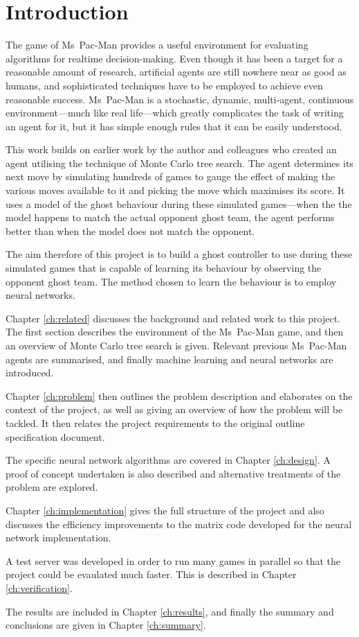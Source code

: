 \chapter{Introduction}
\label{ch:intro}

The game of Ms~Pac-Man provides a useful environment for evaluating algorithms for realtime decision-making.  Even though it has been a target for a reasonable amount of research, artificial agents are still nowhere near as good as humans, and sophisticated techniques have to be employed to achieve even reasonable success.  Ms~Pac-Man is a stochastic, dynamic, multi-agent, continuous environment---much like real life---which greatly complicates the task of writing an agent for it, but it has simple enough rules that it can be easily understood.

This work builds on earlier work by the author and colleagues who created an agent utilising the technique of Monte Carlo tree search.  The agent determines its next move by simulating hundreds of games to gauge the effect of making the various moves available to it and picking the move which maximises its score.  It uses a model of the ghost behaviour during these simulated games---when the the model happens to match the actual opponent ghost team, the agent performs better than when the model does not match the opponent.

The aim therefore of this project is to build a ghost controller to use during these simulated games that is capable of learning its behaviour by observing the opponent ghost team.  The method chosen to learn the behaviour is to employ neural networks.

Chapter \ref{ch:related} discusses the background and related work to this project.  The first section describes the environment of the Ms~Pac-Man game, and then an overview of Monte Carlo tree search is given.  Relevant previous Ms~Pac-Man agents are summarised, and finally machine learning and neural networks are introduced.

Chapter \ref{ch:problem} then outlines the problem description and elaborates on the context of the project, as well as giving an overview of how the problem will be tackled.  It then relates the project requirements to the original outline specification document.

The specific neural network algorithms are covered in Chapter \ref{ch:design}.  A proof of concept undertaken is also described and alternative treatments of the problem are explored.

Chapter \ref{ch:implementation} gives the full structure of the project and also discusses the efficiency improvements to the matrix code developed for the neural network implementation.

A test server was developed in order to run many games in parallel so that the project could be evaulated much faster.  This is described in Chapter \ref{ch:verification}.

The results are included in Chapter \ref{ch:results}, and finally the summary and conclusions are given in Chapter \ref{ch:summary}.
